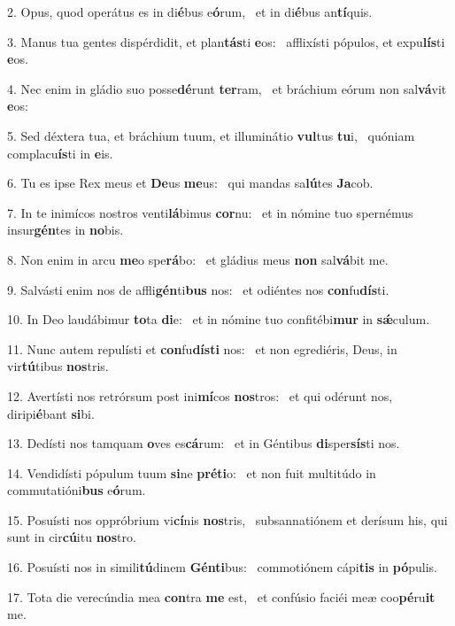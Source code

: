 2. Opus, quod operátus es in di\textbf{é}bus e\textbf{ó}rum, \ast\  et in di\textbf{é}bus an\textbf{tí}quis.\

3. Manus tua gentes dispérdidit, et plan\textbf{tás}ti \textbf{e}os: \ast\  afflixísti pópulos, et expu\textbf{lís}ti \textbf{e}os.\

4. Nec enim in gládio suo posse\textbf{dé}runt \textbf{ter}ram, \ast\  et bráchium eórum non sal\textbf{vá}vit \textbf{e}os:\

5. Sed déxtera tua, et bráchium tuum, et illuminátio \textbf{vul}tus \textbf{tu}i, \ast\  quóniam complacu\textbf{ís}ti in \textbf{e}is.\

6. Tu es ipse Rex meus et \textbf{De}us \textbf{me}us: \ast\  qui mandas sa\textbf{lú}tes \textbf{Ja}cob.\

7. In te inimícos nostros venti\textbf{lá}bimus \textbf{cor}nu: \ast\  et in nómine tuo spernémus insur\textbf{gén}tes in \textbf{no}bis.\

8. Non enim in arcu \textbf{me}o spe\textbf{rá}bo: \ast\  et gládius meus \textbf{non} sal\textbf{vá}bit me.\

9. Salvásti enim nos de affli\textbf{gén}ti\textbf{bus} nos: \ast\  et odiéntes nos \textbf{con}fu\textbf{dís}ti.\

10. In Deo laudábimur \textbf{to}ta \textbf{di}e: \ast\  et in nómine tuo confitébi\textbf{mur} in \textbf{sǽ}culum.\

11. Nunc autem repulísti et \textbf{con}fu\textbf{dís}\textbf{ti} nos: \ast\  et non egrediéris, Deus, in vir\textbf{tú}tibus \textbf{nos}tris.\

12. Avertísti nos retrórsum post ini\textbf{mí}cos \textbf{nos}tros: \ast\  et qui odérunt nos, diripi\textbf{é}bant \textbf{si}bi.\

13. Dedísti nos tamquam \textbf{o}ves es\textbf{cá}rum: \ast\  et in Géntibus \textbf{di}sper\textbf{sís}ti nos.\

14. Vendidísti pópulum tuum \textbf{si}ne \textbf{pré}\textbf{ti}o: \ast\  et non fuit multitúdo in commutatióni\textbf{bus} e\textbf{ó}rum.\

15. Posuísti nos oppróbrium vi\textbf{cí}nis \textbf{nos}tris, \ast\  subsannatiónem et derísum his, qui sunt in cir\textbf{cú}itu \textbf{nos}tro.\

16. Posuísti nos in simili\textbf{tú}dinem \textbf{Gén}\textbf{ti}bus: \ast\  commotiónem cápi\textbf{tis} in \textbf{pó}pulis.\

17. Tota die verecúndia mea \textbf{con}tra \textbf{me} est, \ast\  et confúsio faciéi meæ coo\textbf{pé}ru\textbf{it} me.\

